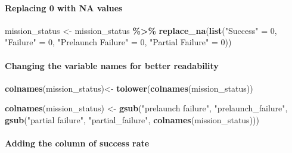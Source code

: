 \documentclass[
]{article}
\newenvironment{Shaded}{\begin{snugshade}}{\end{snugshade}}
\newcommand{\DecValTok}[1]{\textcolor[rgb]{0.00,0.00,0.81}{#1}}
\newcommand{\FunctionTok}[1]{\textcolor[rgb]{0.13,0.29,0.53}{\textbf{#1}}}
\newcommand{\NormalTok}[1]{#1}
\newcommand{\OtherTok}[1]{\textcolor[rgb]{0.56,0.35,0.01}{#1}}
\newcommand{\SpecialCharTok}[1]{\textcolor[rgb]{0.81,0.36,0.00}{\textbf{#1}}}
\newcommand{\StringTok}[1]{\textcolor[rgb]{0.31,0.60,0.02}{#1}}
\begin{document}
\hypertarget{replacing-0-with-na-values}{%
\paragraph{Replacing 0 with NA
values}\label{replacing-0-with-na-values}}

\begin{Shaded}
\begin{Highlighting}[]
\NormalTok{mission\_status }\OtherTok{\textless{}{-}}\NormalTok{ mission\_status }\SpecialCharTok{\%\textgreater{}\%}
  \FunctionTok{replace\_na}\NormalTok{(}\FunctionTok{list}\NormalTok{(}\StringTok{"Success"} \OtherTok{=} \DecValTok{0}\NormalTok{, }\StringTok{"Failure"} \OtherTok{=} \DecValTok{0}\NormalTok{, }\StringTok{"Prelaunch Failure"} \OtherTok{=} \DecValTok{0}\NormalTok{, }\StringTok{"Partial Failure"} \OtherTok{=} \DecValTok{0}\NormalTok{))}
\end{Highlighting}
\end{Shaded}

\hypertarget{changing-the-variable-names-for-better-readability}{%
\paragraph{Changing the variable names for better
readability}\label{changing-the-variable-names-for-better-readability}}

\begin{Shaded}
\begin{Highlighting}[]
\FunctionTok{colnames}\NormalTok{(mission\_status)}\OtherTok{\textless{}{-}} \FunctionTok{tolower}\NormalTok{(}\FunctionTok{colnames}\NormalTok{(mission\_status)) }

\FunctionTok{colnames}\NormalTok{(mission\_status) }\OtherTok{\textless{}{-}}  \FunctionTok{gsub}\NormalTok{(}\StringTok{"prelaunch failure"}\NormalTok{, }\StringTok{"prelaunch\_failure"}\NormalTok{,}
       \FunctionTok{gsub}\NormalTok{(}\StringTok{"partial failure"}\NormalTok{, }\StringTok{"partial\_failure"}\NormalTok{,}
            \FunctionTok{colnames}\NormalTok{(mission\_status)))}
\end{Highlighting}
\end{Shaded}

\hypertarget{adding-the-column-of-success-rate}{%
\paragraph{Adding the column of success
rate}\label{adding-the-column-of-success-rate}}
\end{document}
